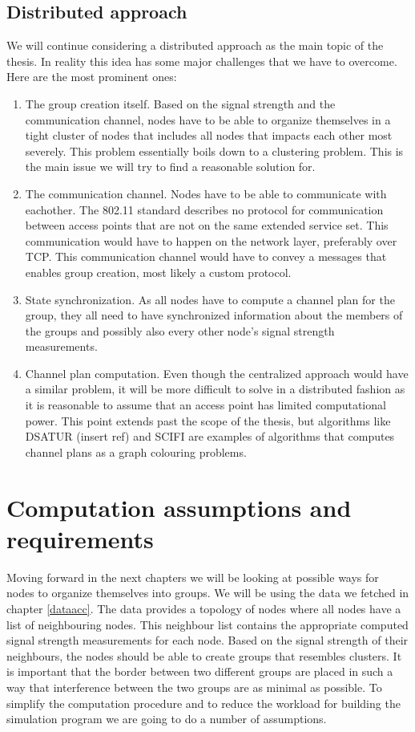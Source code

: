 \subsection{Distributed approach}
We will continue considering a distributed approach as the main topic of the thesis. In reality this idea has some major challenges that we have to overcome. Here are the most prominent ones: 
\begin{enumerate}
	\item The group creation itself. Based on the signal strength and the communication channel, nodes have to be able to organize themselves in a tight cluster of nodes that
		includes all nodes that impacts each other most severely. This problem essentially boils down to a clustering problem. This is the main issue we will
		try to find a reasonable solution for. 
	\item The communication channel. Nodes have to be able to communicate with eachother. The 802.11 standard describes no protocol for communication between access points that are not on the same extended service set. This communication would have to happen on the network layer, preferably over TCP. This communication channel would have to convey a messages that enables group creation,
		most likely a custom protocol. 	
	\item State synchronization. As all nodes have to compute a channel plan for the group, they all need to have synchronized information about the members of the groups
		and possibly also every other node's signal strength measurements. 
	\item Channel plan computation. Even though the centralized approach would have a similar problem, it will be more difficult to solve in a distributed fashion as 
		it is reasonable to assume that an access point has limited computational power. This point extends past the scope of the thesis, but algorithms like DSATUR {{(insert ref)}}
		and SCIFI are examples of algorithms that computes channel plans as a graph colouring problems.
\end{enumerate}

\section{Computation assumptions and requirements}
Moving forward in the next chapters we will be looking at possible ways for nodes to organize themselves into groups.
We will be using the data we fetched in chapter \ref{dataacc}. The data provides a topology of nodes where all nodes have a list of neighbouring nodes.
This neighbour list contains the appropriate computed signal strength measurements for each node. Based on the signal strength of their neighbours, the nodes should be able to create groups that resembles
clusters. It is important that the border between two different groups are placed in such a way that interference between the two groups are as minimal as possible. To simplify the computation procedure and to reduce the workload for building the simulation program we are going to do a number of assumptions. 

